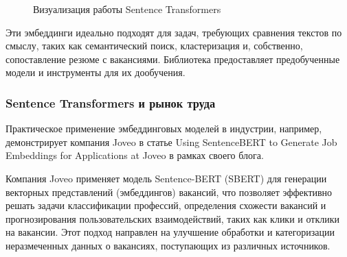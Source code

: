 \documentclass[14pt]{mmcs_article}
\begin{document}
\begin{figure}[h]
  \centering

  \vspace{0.8cm}
  \caption{\centering Визуализация работы Sentence Transformers}
  \label{fig:sentence_transformers_visualization}
\end{figure}


Эти эмбеддинги идеально подходят для задач, требующих сравнения текстов по смыслу, таких как семантический поиск, кластеризация и, собственно, сопоставление резюме с вакансиями. Библиотека предоставляет предобученные модели и инструменты для их дообучения.

\subsubsection*{Sentence Transformers и рынок труда}\label{sentence_transformers_application}

Практическое применение эмбеддинговых моделей в индустрии, например, демонстрирует компания Joveo в статье Using SentenceBERT to Generate Job Embeddings for Applications at Joveo \cite{joveo_sentencebert_2022} в рамках своего блога.

Компания Joveo применяет модель Sentence-BERT (SBERT) для генерации векторных представлений (эмбеддингов) вакансий, что позволяет эффективно решать задачи классификации профессий, определения схожести вакансий и прогнозирования пользовательских взаимодействий, таких как клики и отклики на вакансии. Этот подход направлен на улучшение обработки и категоризации неразмеченных данных о вакансиях, поступающих из различных источников.
\end{document}
